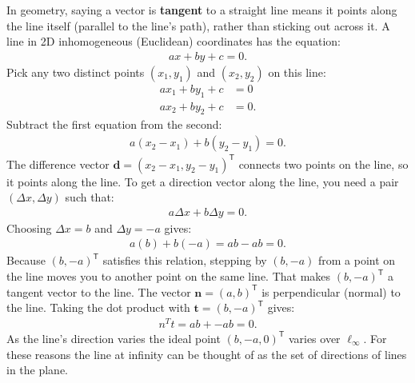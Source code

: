 \documentclass{report}
\begin{document}
\begin{itemize}
            \bigbreak \noindent 
            In geometry, saying a vector is \textbf{tangent} to a straight line means it points along the line itself (parallel to the line's path), rather than sticking out across it.
            \bigbreak \noindent 
            A line in 2D inhomogeneous (Euclidean) coordinates has the equation: 
            \begin{align*}
                ax+by+c=0
            .\end{align*}
            Pick any two distinct points \((x_1, y_1)\) and \((x_2, y_2)\) on this line:
            \begin{align*}
                ax_{1}+by_{1}+c&=0 \\
                ax_{2}+by_{2}+c&=0
            .\end{align*}
            Subtract the first equation from the second:
            \begin{align*}
                a(x_{2}-x_{1})+b(y_{2}-y_{1})=0
            .\end{align*}
            The difference vector \(\mathbf{d} = (x_2 - x_1, y_2 - y_1)^{\mathsf{T}}\) connects two points on the line, so it points along the line.
            \bigbreak \noindent 
            To get a direction vector along the line, you need a pair \((\Delta x, \Delta y)\) such that:
            \begin{align*}
                a \Delta x + b \Delta y = 0
            .\end{align*}
            Choosing \(\Delta x = b\) and \(\Delta y = -a\) gives:
            \begin{align*}
                a(b)+b(-a)=ab-ab=0
            .\end{align*}
            Because \((b, -a)^{\mathsf{T}}\) satisfies this relation, stepping by \((b, -a)\) from a point on the line moves you to another point on the same line. That makes \((b, -a)^{\mathsf{T}}\) a tangent vector to the line.
            \bigbreak \noindent 
            The vector \(\mathbf{n} = (a, b)^{\mathsf{T}}\) is perpendicular (normal) to the line. Taking the dot product with \(\mathbf{t} = (b, -a)^{\mathsf{T}}\) gives:
            \begin{align*}
                n^{T}t = ab + -ab = 0
            .\end{align*}
            As the line’s direction varies the ideal point $(b, -a, 0)^{\mathsf{T}}$ varies over $\mathbf{\ell}_{\infty }$. For these reasons the line at infinity can be thought of as the set of directions of lines in the plane.

\end{itemize}
\end{document}
